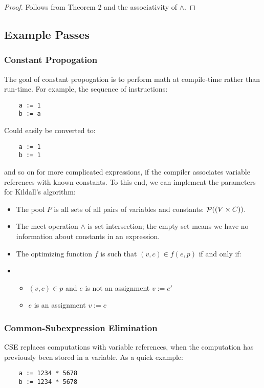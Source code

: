 \documentclass{article}
\begin{document}
\begin{c1}
\end{c1}
\begin{proof}
Follows from Theorem 2 and the associativity of $\wedge$.
\end{proof}


\subsection*{Example Passes}
\label{examples}

\subsubsection*{Constant Propogation}
The goal of constant propogation is to perform math at compile-time rather than run-time.
For example, the sequence of instructions:

\begin{lstlisting}
    a := 1
    b := a
\end{lstlisting}

Could easily be converted to:

\begin{lstlisting}
    a := 1
    b := 1
\end{lstlisting}

and so on for more complicated expressions, if the compiler associates variable references with known constants.
To this end, we can implement the parameters for Kildall's algorithm:
\begin{itemize}
\item The pool $P$ is all sets of all pairs of variables and constants: $\mathcal{P}((V \times C))$.
\item The meet operation $\wedge$ is set intersection; the empty set means we have no information about constants in an expression.
\item The optimizing function $f$ is such that $(v, c) \in f(e, p)$ if and only if:
\item[]
  \begin{itemize}
  \item $(v, c) \in p$ and $e$ is not an assignment $v := e'$
  \item $e$ is an assignment $v := c$
  \end{itemize}
\end{itemize}

\subsubsection*{Common-Subexpression Elimination}
CSE replaces computations with variable references, when the computation has previously been stored in a variable.
As a quick example:
\begin{lstlisting}
    a := 1234 * 5678
    b := 1234 * 5678
\end{lstlisting}
\end{document}
